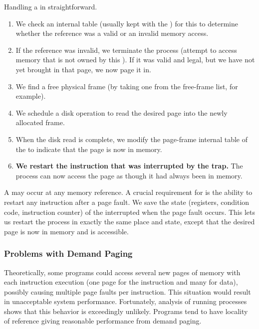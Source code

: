 Handling a  in straightforward.
\begin{enumerate}[noitemsep]
\item We check an internal table (usually kept with the ) for this  to determine whether the reference was a valid or an invalid memory access.
\item If the reference was invalid, we terminate the process (attempt to access memory that is not owned by this ).
  If it was valid and legal, but we have not yet brought in that page, we now page it in.
\item We find a free physical frame (by taking one from the free-frame list, for example).
\item We schedule a disk operation to read the desired page into the newly allocated frame.
\item When the disk read is complete, we modify the page-frame internal table of the  to indicate that the page is now in memory.
\item \textbf{We restart the instruction that was interrupted by the trap.}
  The process can now access the page as though it had always been in memory.
\end{enumerate}

A  may occur at any memory reference.
A crucial requirement for  is the ability to restart any instruction after a page fault.
We save the state (registers, condition code, instruction counter) of the interrupted  when the page fault occurs.
This lets us restart the process in exactly the same place and state, except that the desired page is now in memory and is accessible.

\subsubsection{Problems with Demand Paging}\label{subsubsec:Demand_Paging_Problems}
Theoretically, some programs could access several new pages of memory with each instruction execution (one page for the instruction and many for data), possibly causing multiple page faults per instruction.
This situation would result in unacceptable system performance.
Fortunately, analysis of running processes shows that this behavior is exceedingly unlikely.
Programs tend to have locality of reference giving reasonable performance from demand paging.


